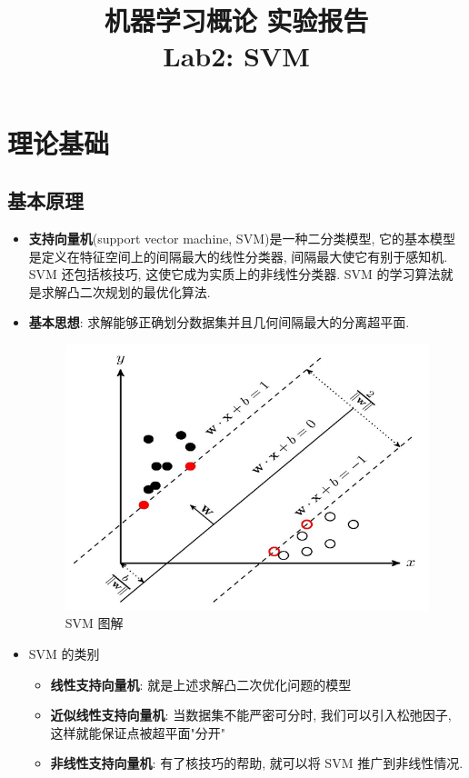 \documentclass[UTF8]{article}
\title{机器学习概论 实验报告 \\ \Large Lab2: SVM}
\begin{document}
\maketitle
\section{理论基础}
\subsection{基本原理}
\begin{itemize}
	\item \textbf{支持向量机}(support vector machine, SVM)是一种二分类模型, 它的基本模型是定义在特征空间上的间隔最大的线性分类器, 间隔最大使它有别于感知机. SVM 还包括核技巧, 这使它成为实质上的非线性分类器. SVM 的学习算法就是求解凸二次规划的最优化算法.
	\item \textbf{基本思想}: 求解能够正确划分数据集并且几何间隔最大的分离超平面.
	\begin{figure}[H]
		\centering
		\includegraphics[width=\linewidth/5*2]{SVM.png}
		\caption{SVM 图解}
	\end{figure}
	\item SVM 的类别
	\begin{itemize}
		\item \textbf{线性支持向量机}: 就是上述求解凸二次优化问题的模型
		\item \textbf{近似线性支持向量机}: 当数据集不能严密可分时, 我们可以引入松弛因子, 这样就能保证点被超平面"分开"
		\item \textbf{非线性支持向量机}: 有了核技巧的帮助, 就可以将 SVM 推广到非线性情况.
	\end{itemize}
\end{itemize}
\end{document}
